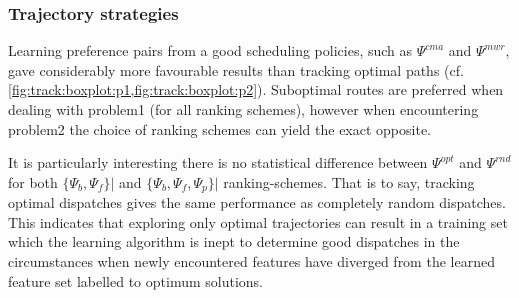 \begin{comment}
Combining the ranking schemes, $\Psi_a$, improves the individual 
ranking-schemes across all disciplines, except in the case of 

$\Psi_b^{opt}\big|_{\mathcal{P_1}}$ and $\Psi_b^{rnd}\big|$\!\Problem{2}, in 
which 
case there were no statistical difference. Now, for the test set, the results 
hold, however there is no statistical difference between $\Psi_b$ and $\Psi_a$ 
for most trajectories $\{\Psi^{opt},\Psi^{cma},\Psi^{rnd}\}\big|$\!\Problem{1} 
and  $\{\Psi^{opt},\Psi^{rnd}\}\big|$\!\Problem{2}. Now, whereas a smaller 
preference set is preferred, its opted to use the $\Psi^{b}$ ranking scheme 
henceforth. 

Moreover, it is noted that the learning algorithm is able to significantly 
outperform the original heuristics, MWR and CMA-ES (white), used to create the 
training data $\Psi^{mwr}$ (grey) and $\Psi^{cma}$ (yellow), respectively (cf. 
\cref{fig:track:boxplot:p1,fig:track:boxplot:p2}). For both \Problem{1} and 
\Problem{2}, linear ordinal regression models based on $\Psi^{mwr}$ are 
significantly better than $MWR$, irrespective of the ranking schemes. Whereas 
the fixed weights found via CMA-ES are only outperformed by linear ordinal 
regression models based on $\{\Psi_b^{cma},\Psi_a^{cma}\}$. This implies that 
ranking scheme needs to be selected appropriately. Result hold for the test 
data.
\end{comment}

\subsubsection{Trajectory strategies}
Learning preference pairs from a good scheduling policies, such as $\Psi^{cma}$ 
and $\Psi^{mwr}$, gave considerably more favourable results than tracking 
optimal paths (cf. \cref{fig:track:boxplot:p1,fig:track:boxplot:p2}). 
Suboptimal routes are preferred when dealing with problem{1} (for all ranking 
schemes), however when encountering problem{2} the choice of ranking schemes 
can yield the exact opposite.

It is particularly interesting there is no statistical difference between 
$\Psi^{opt}$ and $\Psi^{rnd}$ for both $\{\Psi_{b},\Psi_{f}\}\big|$ 
and 
$\{\Psi_b,\Psi_f,\Psi_p\}\big|$ ranking-schemes. That is to say, 
tracking 
optimal dispatches gives the same performance as completely random dispatches. 
This indicates that exploring only optimal trajectories can result in a 
training set which the learning algorithm is inept to determine good dispatches 
in the circumstances when newly encountered features have diverged from the 
learned feature set labelled to optimum solutions. 

